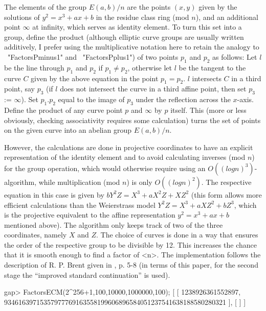 The elements of the group $E(a,b)/n$ are the points $(x,y)$ given by the
solutions of $y^2 = x^3 + ax + b$ in the residue class ring (mod $n$),
and an additional point $\infty$ at infinity, which serves as 
identity element. 
To turn this set into a group, define the product 
(although elliptic curve groups are usually written additively,
I prefer using the multiplicative notation here to retain the analogy
to ~"FactorsPminus1" and ~"FactorsPplus1") of two points
$p_1$ and $p_2$ as follows:
Let $l$ be the line through $p_1$ and $p_2$ if $p_1 \neq p_2$,
otherwise let $l$ be the tangent to the curve $C$ given by the 
above equation in the point $p_1 = p_2$.
$l$ intersects $C$ in a third point, say $p_3$ 
(if $l$ does not intersect the curve in a
third affine point, then set $p_3$ := $\infty$). 
Set $p_1.p_2$ equal to the image of $p_3$ under
the reflection across the $x$-axis.
Define the product of any curve point $p$ and $\infty$ by $p$ itself.
This (more or less obviously, checking associativity requires some
calculation) turns the set of points on the given curve
into an abelian group $E(a,b)/n$.

However, the calculations are done in
projective coordinates to have an explicit representation of the 
identity element and to avoid calculating inverses (mod $n$)
for the group operation, which would otherwise require using an 
$O((log n)^3)$-algorithm, while multiplication (mod $n$) is only 
$O((log n)^2)$. The respective equation in this case is given by 
$bY^2Z = X^3 + aX^2Z + XZ^2$ (this form allows more efficient
calculations than the
Weierstrass model 
$Y^2Z = X^3 + aXZ^2 + bZ^3$, which is the projective equivalent to
the affine representation $y^2 = x^3 + ax + b$ mentioned above).
The algorithm only keeps track of two of the three coordinates,
namely $X$ and $Z$.
The choice of curves is done in a way that ensures the order of
the respective group to be divisible by 12. This increases the
chance that it is smooth enough to find a factor of <n>.
The implementation follows the description of R. P. Brent given in
\cite{BrentsECM}, p. 5-8 (in terms of this paper,
for the second stage the ``improved standard continuation'' is used).

\beginexample
gap> FactorsECM(2^256+1,100,10000,1000000,100);
[ [ 1238926361552897, 
      93461639715357977769163558199606896584051237541638188580280321 ], [  ] ]
\endexample


